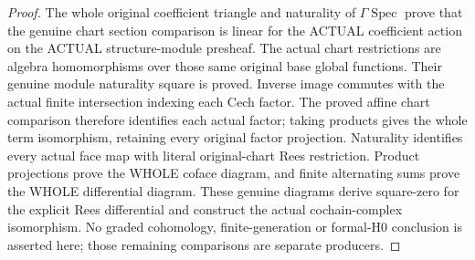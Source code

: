 \begin{proof}
The whole original coefficient triangle and naturality of
$\Gamma\operatorname{Spec}$ prove that the genuine chart section comparison is
linear for the ACTUAL coefficient action on the ACTUAL structure-module presheaf.
The actual chart restrictions are algebra homomorphisms over those same original
base global functions. Their genuine module naturality square is proved.
Inverse image commutes with the actual finite intersection indexing each Cech
factor. The proved affine chart comparison therefore identifies each actual factor;
taking products gives the whole term isomorphism, retaining every original factor
projection. Naturality identifies every actual face map with literal original-chart
Rees restriction. Product projections prove the WHOLE coface diagram, and finite
alternating sums prove the WHOLE differential diagram. These genuine diagrams
derive square-zero for the explicit Rees differential and construct the actual
cochain-complex isomorphism. No graded cohomology, finite-generation or formal-H0
conclusion is asserted here; those remaining comparisons are separate producers.
\end{proof}

